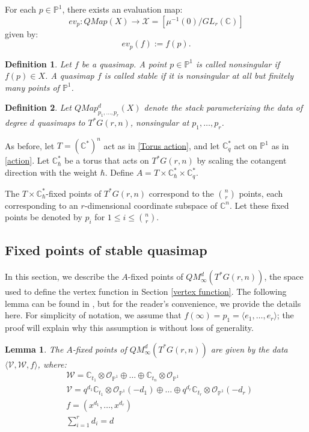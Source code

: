 \documentclass{amsart}
\newtheorem{definition}{Definition}
\newtheorem{lemma}[thm]{Lemma}
\begin{document}
For each $p \in \mathbb{P}^1$, there exists an evaluation map:
\[
ev_p: QMap(X) \to \mathcal{X}=[\mu^{-1}(0)/GL_r(\mathbb{C})]
\]
given by:
\[
ev_p(f) := f(p).
\]
\begin{definition}
    Let $f$ be a quasimap. A point $p \in \mathbb{P}^1$ is called nonsingular if $f(p) \in X$. A quasimap $f$ is called stable if it is nonsingular at all but finitely many points of $\mathbb{P}^1$.
\end{definition}

\begin{definition}
Let $QMap_{p_1,\dots,p_r}^d(X)$ denote the stack parameterizing 
the data of degree $d$ quasimaps to $T^*G(r,n)$, nonsingular at $p_1,\dots,p_r$.
\end{definition}
As before, let $T = (\mathbb{C}^*)^n$ act as in \eqref{Torus action}, and let $\mathbb{C}_q^*$ act on $\mathbb{P}^1$ as in \eqref{action}. 
Let $\mathbb{C}^*_{\hbar}$ be a torus that acts on $T^*G(r,n)$ by scaling the cotangent direction with the weight $\hbar$. Define $A=T \times \mathbb{C}^*_{\hbar} \times \mathbb{C}_q^*$.

The $T \times \mathbb{C}^*_{\hbar}$-fixed points of $T^*G(r,n)$ correspond to the $\binom{n}{r}$ points, each corresponding to an $r$-dimensional coordinate subspace of $\mathbb{C}^n$. Let these fixed points be denoted by $p_i$ for $1 \leq i \leq {\binom{n}{r}}$.  


\subsection{Fixed points of stable quasimap}
In this section, we describe the $A$-fixed points of $QM_{\infty}^d(T^*G(r,n))$, the space used to define the vertex function in Section \eqref{vertex function}. The following lemma can be found in \cite[Section 4.4]{PSZ}, but for the reader's convenience, we provide the details here. For simplicity of notation, we assume that $f(\infty) = p_1 = \langle e_1, \dots, e_r \rangle$; the proof will explain why this assumption is without loss of generality.
\begin{lemma}\label{lemma:qmap-fixed}
    The $A$-fixed points of $QM_{\infty}^d(T^*G(r,n))$ are given by the data $\langle\mathcal{V},\mathcal{W},f\rangle$, where:
    \begin{align*}
    &\mathcal{W} = \mathbb{C}_{t_1}\otimes\mathcal{O}_{\mathbb{P}^1} \oplus\dots\oplus \mathbb{C}_{t_n}\otimes \mathcal{O}_{\mathbb{P}^1}\\&
    \mathcal{V} = q^{d_1}\mathbb{C}_{t_1}\otimes\mathcal{O}_{\mathbb{P}^1}(-d_1) \oplus \dots \oplus q^{d_r}\mathbb{C}_{t_r}\otimes\mathcal{O}_{\mathbb{P}^1}(-d_r) \\&
    f = (x^{d_1},\dots,x^{d_r})\\&
    \sum_{i=1}^{r} d_i = d
\end{align*}
\end{lemma}
\end{document}
